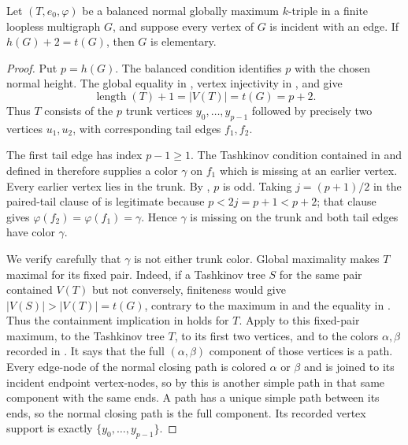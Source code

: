 \begin{lemma}
Let $(T,e_0,\varphi)$ be a balanced normal globally maximum $k$-triple in
a finite loopless multigraph $G$, and suppose every vertex of $G$ is
incident with an edge.  If $h(G)+2=t(G)$, then $G$ is elementary.
\end{lemma}
\begin{proof}
Put $p=h(G)$.  The balanced condition
 identifies $p$ with the chosen
normal height.  The global equality in ,
vertex injectivity in , and
 give
\[
 \operatorname{length}(T)+1=|V(T)|=t(G)=p+2.
\]
Thus $T$ consists of the $p$ trunk vertices
$y_0,\ldots,y_{p-1}$ followed by precisely two vertices $u_1,u_2$, with
corresponding tail edges $f_1,f_2$.

The first tail edge has index $p-1\geq1$.  The Tashkinov condition contained
in  and defined in
 therefore supplies a color $\gamma$ on $f_1$ which
is missing at an earlier vertex.  Every earlier vertex lies in the trunk.
By , $p$ is odd.  Taking
$j=(p+1)/2$ in the paired-tail clause of
 is legitimate because
$p<2j=p+1<p+2$; that clause gives
$\varphi(f_2)=\varphi(f_1)=\gamma$.  Hence $\gamma$ is missing on the
trunk and both tail edges have color $\gamma$.

We verify carefully that $\gamma$ is not either trunk color.  Global
maximality makes $T$ maximal for its fixed pair.  Indeed, if a Tashkinov
tree $S$ for the same pair contained $V(T)$ but not conversely, finiteness
would give $|V(S)|>|V(T)|=t(G)$, contrary to the maximum in
 and the equality in
.  Thus the containment implication in
 holds for $T$.  Apply
 to this fixed-pair maximum, to the
Tashkinov tree $T$, to its first two vertices, and to the colors
$\alpha,\beta$ recorded in .  It says
that the full $(\alpha,\beta)$ component of those vertices is a path.
Every edge-node of the normal closing path is colored $\alpha$ or $\beta$
and is joined to its incident endpoint vertex-nodes, so by
 this is another simple path in that same
component with the same ends.  A path has a unique simple path between its
ends, so the normal closing path is the full component.  Its recorded
vertex support is exactly $\{y_0,\ldots,y_{p-1}\}$.


\end{proof}
